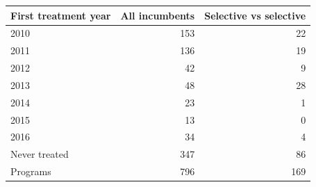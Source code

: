 \begin{tabular}{lrr}
\toprule
First treatment year & All incumbents & Selective vs selective \\
\midrule
2010 &   153 &    22 \\
2011 &   136 &    19 \\
2012 &    42 &     9 \\
2013 &    48 &    28 \\
2014 &    23 &     1 \\
2015 &    13 &     0 \\
2016 &    34 &     4 \\
Never treated &   347 &    86 \\
\midrule
Programs &   796 &   169 \\
\bottomrule
\end{tabular}
